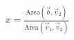 \documentclass[preview]{standalone}
\begin{document}
\begin{align*}
x = \frac{\text{Area}(\vec{b}, \vec{v}_2)}{\text{Area}(\vec{v}_1, \vec{v}_2)}
\end{align*}
\end{document}
